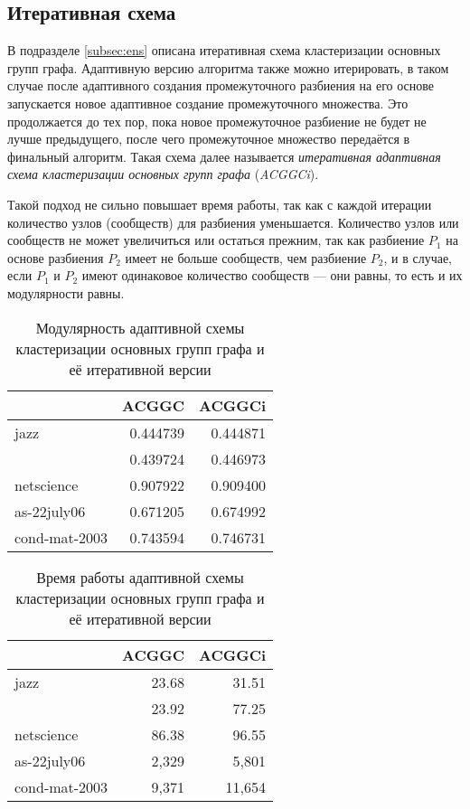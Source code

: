 
\subsection{Итеративная схема}
\label{subsec:cggci}

В подразделе \ref{subsec:ens} описана итеративная схема кластеризации основных групп графа. Адаптивную версию алгоритма также можно итерировать, в таком случае после адаптивного создания промежуточного разбиения на его основе запускается новое адаптивное создание промежуточного множества. Это продолжается до тех пор, пока новое промежуточное разбиение не будет не лучше предыдущего, после чего промежуточное множество передаётся в финальный алгоритм. Такая схема далее называется \emph{итеративная адаптивная схема кластеризации основных групп графа} (\emph{ACGGCi}).

Такой подход не сильно повышает время работы, так как с каждой итерации количество узлов (сообществ) для разбиения уменьшается. Количество узлов или сообществ не может увеличиться или остаться прежним, так как разбиение $P_1$ на основе разбиения $P_2$ имеет не больше сообществ, чем разбиение $P_2$, и в случае, если $P_1$ и $P_2$ имеют одинаковое количество сообществ --- они равны, то есть и их модулярности равны.

\begin{multicols}{2}
\begin{table}[H]
	\caption{Модулярность адаптивной схемы кластеризации основных групп графа и её итеративной версии}
	\label{tab-es-iter-q}
	\begin{tabularx}{\columnwidth}{Xrr}\hline
					& \multicolumn{1}{c}{ACGGC}	& \multicolumn{1}{c}{ACGGCi} \\\hline
	jazz 			& 0.444739	& 0.444871	\\
	\celegans 		& 0.439724	& 0.446973	\\
	netscience 		& 0.907922	& 0.909400	\\
	as-22july06		& 0.671205	& 0.674992	\\
	cond-mat-2003	& 0.743594	& 0.746731	\\
	\hline
	\end{tabularx}
\end{table}
\begin{table}[H]
	\caption{Время работы адаптивной схемы кластеризации основных групп графа и её итеративной версии}
	\label{tab-es-iter-t}
	\begin{tabularx}{\columnwidth}{lrr}\hline
					& \multicolumn{1}{c}{ACGGC}	& \multicolumn{1}{c}{ACGGCi} \\\hline
	jazz 			& 23.68		& 31.51		\\
	\celegans 		& 23.92		& 77.25		\\
	netscience 		& 86.38		& 96.55		\\
	as-22july06		& 2,329		& 5,801		\\
	cond-mat-2003	& 9,371		& 11,654	\\
	\hline
	\end{tabularx}
\end{table}
\end{multicols}

